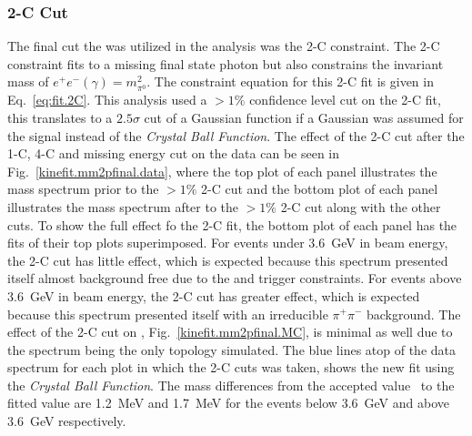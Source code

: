 \subsubsection{2-C Cut}
The final cut the was utilized in the analysis was the 2-C constraint. The 2-C constraint fits to a missing final state photon but also constrains the invariant mass of $e^+e^-(\gamma) = m_{\pi^0}^2$. The constraint equation for this 2-C fit is given in Eq.~\ref{eq:fit.2C}. This analysis used a $>1\%$ confidence level cut on the 2-C fit, this translates to a $2.5\sigma$ cut of a Gaussian function if a Gaussian was assumed for the signal instead of the \emph{Crystal Ball Function}. The effect of the 2-C cut after the 1-C, 4-C and missing energy cut on the data can be seen in Fig.~\ref{kinefit.mm2pfinal.data}, where the top plot of each panel illustrates the mass spectrum prior to the $>1\%$ 2-C cut and the bottom plot of each panel illustrates the mass spectrum after to the $>1\%$ 2-C cut along with the other cuts. To show the full effect fo the 2-C fit, the bottom plot of each panel has the fits of their top plots superimposed. For events under 3.6~GeV in beam energy, the 2-C cut has little effect, which is expected because this spectrum presented itself almost background free due to the  and  trigger constraints. For events above 3.6~GeV in beam energy, the 2-C cut has greater effect, which is expected because this spectrum presented itself with an irreducible $\pi^+\pi^-$ background. The effect of the 2-C cut on , Fig.~\ref{kinefit.mm2pfinal.MC}, is minimal as well due to the \piz spectrum being the only topology simulated. The blue lines atop of the data spectrum for each plot in which the 2-C cuts was taken, shows the new fit using the \emph{Crystal Ball Function}. The mass differences from the accepted value~\cite{pdg2014} to the fitted value are 1.2~MeV and 1.7~MeV for the events below 3.6~GeV and above 3.6~GeV respectively.
